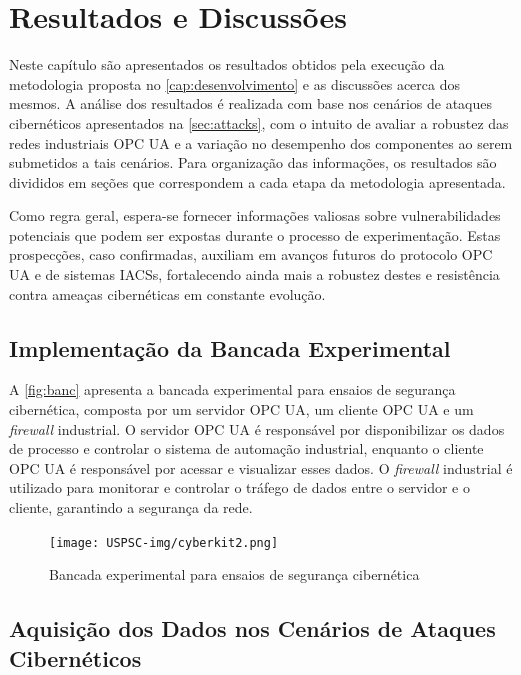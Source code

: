 \chapter{Resultados e Discussões} \label{cap:resultados}

Neste capítulo são apresentados os resultados obtidos pela execução da metodologia proposta no \autoref{cap:desenvolvimento} e as discussões acerca dos mesmos. A análise dos resultados é realizada com base nos cenários de ataques cibernéticos apresentados na \autoref{sec:attacks}, com o intuito de avaliar a robustez das redes industriais OPC UA e a variação no desempenho dos componentes ao serem submetidos a tais cenários. Para organização das informações, os resultados são divididos em seções que correspondem a cada etapa da metodologia apresentada.

Como regra geral, espera-se fornecer informações valiosas sobre vulnerabilidades potenciais que podem ser expostas durante o processo de experimentação. Estas prospecções, caso confirmadas, auxiliam em avanços futuros do protocolo OPC UA e de sistemas IACSs, fortalecendo ainda mais a robustez destes e resistência contra ameaças cibernéticas em constante evolução.

\section{Implementação da Bancada Experimental} \label{sec:impl-bancada}

A \autoref{fig:banc} apresenta a bancada experimental para ensaios de segurança cibernética, composta por um servidor OPC UA, um cliente OPC UA e um \textit{firewall} industrial. O servidor OPC UA é responsável por disponibilizar os dados de processo e controlar o sistema de automação industrial, enquanto o cliente OPC UA é responsável por acessar e visualizar esses dados. O \textit{firewall} industrial é utilizado para monitorar e controlar o tráfego de dados entre o servidor e o cliente, garantindo a segurança da rede.

\begin{figure}[htbp!]
    \caption{\label{fig:banc}Bancada experimental para ensaios de segurança cibernética}
    \begin{center}
        \texttt{[image: USPSC-img/cyberkit2.png]}
    \end{center}
\end{figure}

\section{Aquisição dos Dados nos Cenários de Ataques Cibernéticos} \label{sec:exec-attacks}


